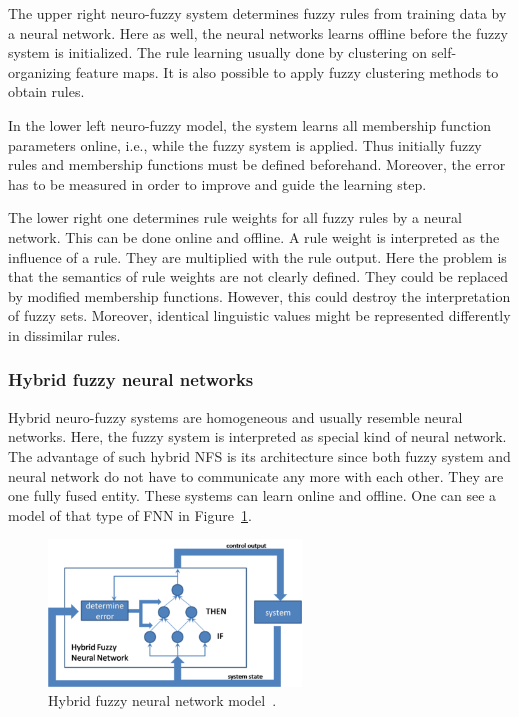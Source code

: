 The upper right neuro-fuzzy system determines fuzzy rules from training data by a neural network.
Here as well, the neural networks learns offline before the fuzzy system is initialized.
The rule learning usually done by clustering on self-organizing feature maps.
It is also possible to apply fuzzy clustering methods to obtain rules.

In the lower left neuro-fuzzy model, the system learns all membership function parameters online, i.e., while the fuzzy system is applied. Thus initially fuzzy rules and membership functions must be defined beforehand. Moreover, the error has to be measured in order to improve and guide the learning step.

The lower right one determines rule weights for all fuzzy rules by a neural network. This can be done online and offline. A rule weight is interpreted as the influence of a rule.
They are multiplied with the rule output.
Here the problem is that the semantics of rule weights are not clearly defined.
They could be replaced by modified membership functions.
However, this could destroy the interpretation of fuzzy sets.
Moreover, identical linguistic values might be represented differently in dissimilar rules.

\subsubsection{Hybrid fuzzy neural networks}

Hybrid neuro-fuzzy systems are homogeneous and usually resemble neural networks.
Here, the fuzzy system is interpreted as special kind of neural network.
The advantage of such hybrid NFS is its architecture since both fuzzy system and neural network do not have to communicate any more with each other.
They are one fully fused entity.
These systems can learn online and offline.
One can see a model of that type of FNN in Figure~\ref{fig:fnn_hybrid}.

\begin{figure}
	\vspace*{-1.5em}
	\includegraphics[width=0.6\textwidth]{images/fnn_hybrid.png}
	\caption{Hybrid fuzzy neural network model~\cite{scholarpedia_fuzzy_neural}.}
	\label{fig:fnn_hybrid}
\end{figure}

